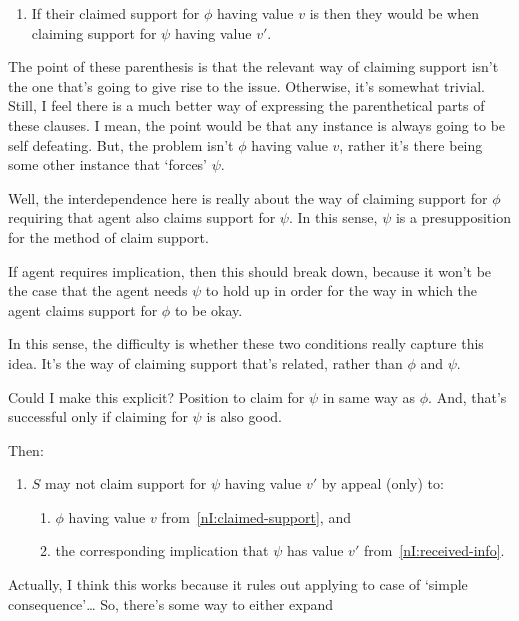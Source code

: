 \begin{note}[\nI{}]
\begin{proposition}[\nI{-}  --- \nI{}]
\begin{enumerate}[ref=\named{\nItext{}:\arabic*}, resume*=nI_counter]
\begin{enumerate}[label=\alph*., ref=\named{\nItext{}3:\alph*}]
{        }
      \item\label{nI:inclusion:bound} If their claimed support for \(\phi\) having value \(v\) is \nmom{} then they would be \nmom{} when claiming support for \(\psi\) having value \(v'\).
      \end{enumerate}
    \end{enumerate}
    {
      \color{red}
      The point of these parenthesis is that the relevant way of claiming support isn't the one that's going to give rise to the issue.
      Otherwise, it's somewhat trivial.
      Still, I feel there is a much better way of expressing the parenthetical parts of these clauses.
      I mean, the point would be that any instance is always going to be self defeating.
      But, the problem isn't \(\phi\) having value \(v\), rather it's there being some other instance that `forces' \(\psi\).
    }
    {
      \color{blue}
      Well, the interdependence here is really about the way of claiming support for \(\phi\) requiring that agent also claims support for \(\psi\).
      In this sense, \(\psi\) is a presupposition for the method of claim support.

      If agent requires implication, then this should break down, because it won't be the case that the agent needs \(\psi\) to hold up in order for the way in which the agent claims support for \(\phi\) to be okay.

      In this sense, the difficulty is whether these two conditions really capture this idea.
      It's the way of claiming support that's related, rather than \(\phi\) and \(\psi\).

      Could I make this explicit?
      Position to claim for \(\psi\) in same way as \(\phi\).
      And, that's successful only if claiming for \(\psi\) is also good.
    }
    Then:
    \begin{enumerate}[ref=\named{\nItext{}:\arabic*}, resume*=nI_counter]
    \item\label{nI:going-by-value} \(S\) may not claim support for \(\psi\) having value \(v'\) by appeal (only) to:
      \begin{enumerate}[label=\alph*., ref=\named{\nItext{}4:\alph*}]
      \item\label{nI:going-by-value:phi} \(\phi\) having value \(v\) from~\ref{nI:claimed-support}, and
      \item\label{nI:goingbyvalue:psi} the corresponding implication that \(\psi\) has value \(v'\) from~\ref{nI:received-info}.
      \end{enumerate}
    \end{enumerate}
    {
      \color{red}
      Actually, I think this works because it rules out \nI{} applying to case of `simple consequence'\dots
      So, there's some way to either expand 
    }
    \vspace{-\topsep}\vspace{-\topsep}
  \end{proposition}
\end{note}

